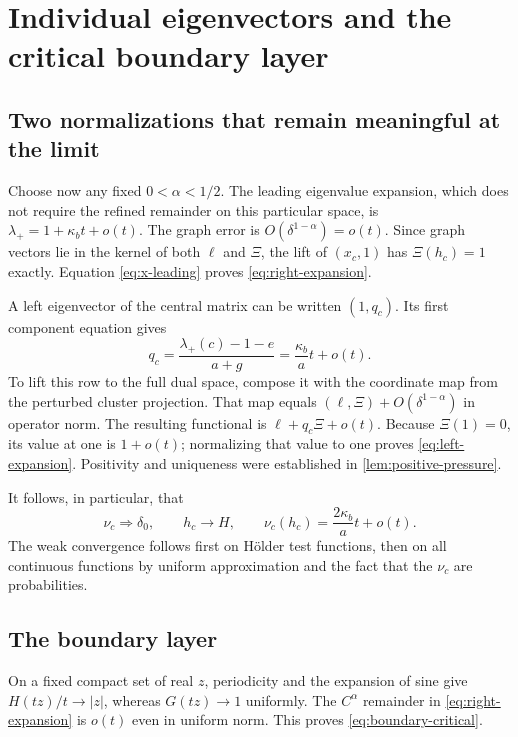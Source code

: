 \documentclass[11pt,a4paper]{article}
\numberwithin{equation}{section}
\theoremstyle{definition}
\theoremstyle{remark}
\begin{document}
\section{Individual eigenvectors and the critical boundary layer}
\label{sec:eigenvectors}

\subsection{Two normalizations that remain meaningful at the limit}
Choose now any fixed $0<\alpha<1/2$. The leading eigenvalue expansion,
which does not require the refined remainder on this particular space,
is $\lambda_+=1+\kappa_b t+o(t)$. The graph error is
$O(\delta^{1-\alpha})=o(t)$. Since graph vectors lie in the kernel of
both $\ell$ and $\Xi$, the lift of $(x_c,1)$ has $\Xi(h_c)=1$ exactly.
Equation \cref{eq:x-leading} proves
\cref{eq:right-expansion}.

A left eigenvector of the central matrix can be written $(1,q_c)$.
Its first component equation gives
\begin{equation}
 q_c=\frac{\lambda_+(c)-1-e}{a+g}
          =\frac{\kappa_b}{a}t+o(t).
 \label{eq:q-leading}
\end{equation}
To lift this row to the full dual space, compose it with the coordinate
map from the perturbed cluster projection. That map equals
$(\ell,\Xi)+O(\delta^{1-\alpha})$ in operator norm. The resulting
functional is
$\ell+q_c\Xi+o(t)$. Because $\Xi(1)=0$, its value at one is $1+o(t)$;
normalizing that value to one proves \cref{eq:left-expansion}.
Positivity and uniqueness were established in \cref{lem:positive-pressure}.

It follows, in particular, that
\begin{equation}
 \nu_c\Longrightarrow\delta_0,\qquad
 h_c\longrightarrow H,\qquad
 \nu_c(h_c)=\frac{2\kappa_b}{a}t+o(t).
 \label{eq:normalization-collapse}
\end{equation}
The weak convergence follows first on H\"older test functions, then on
all continuous functions by uniform approximation and the fact that the
$\nu_c$ are probabilities.

\subsection{The boundary layer}
On a fixed compact set of real $z$, periodicity and the expansion of
sine give $H(tz)/t\to|z|$, whereas $G(tz)\to1$ uniformly.
The $C^\alpha$ remainder in \cref{eq:right-expansion} is $o(t)$ even in
uniform norm. This proves \cref{eq:boundary-critical}.
\end{document}
